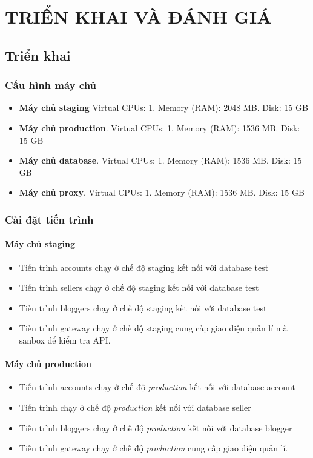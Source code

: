 
\chapter{TRIỂN KHAI VÀ ĐÁNH GIÁ}\label{section:dev}
\fontsize{13px}{13px}\selectfont\justifying
\section{Triển khai}

\subsection{Cấu hình máy chủ}

\begin{itemize}
	\item \textbf{Máy chủ staging} Virtual CPUs: 1. Memory (RAM): 2048 MB. Disk: 15 GB
	
	\item \textbf{Máy chủ production}. Virtual CPUs: 1. Memory (RAM): 1536 MB. Disk: 15 GB
	
	\item \textbf{Máy chủ database}. Virtual CPUs: 1. Memory (RAM): 1536 MB. Disk: 15 GB
	
	\item \textbf{Máy chủ proxy}. Virtual CPUs: 1. Memory (RAM): 1536 MB. Disk: 15 GB
\end{itemize}
\subsection{Cài đặt tiến trình}


\subsubsection{Máy chủ staging}
\begin{itemize}
	\item Tiến trình accounts chạy ở chế độ staging kết nối với database test
	\item Tiến trình sellers chạy ở chế độ staging kết nối với database test
	\item Tiến trình bloggers chạy ở chế độ staging kết nối với database test
	\item Tiến trình gateway chạy ở chế độ staging cung cấp giao diện quản lí mà sanbox để kiểm tra API.
\end{itemize}
\subsubsection{Máy chủ production}
\begin{itemize}
	\item Tiến trình accounts chạy ở chế độ \emph{production} kết nối với database account
	\item Tiến trình  chạy ở chế độ \emph{production} kết nối với database seller
	\item Tiến trình bloggers chạy ở chế độ \emph{production} kết nối với database blogger
	\item Tiến trình gateway chạy ở chế độ \emph{production} cung cấp giao diện quản lí.
\end{itemize}

